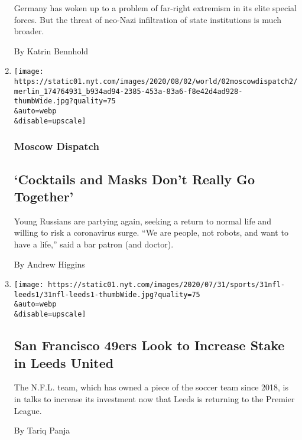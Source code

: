 \begin{enumerate}
  Germany has woken up to a problem of far-right extremism in its elite
  special forces. But the threat of neo-Nazi infiltration of state
  institutions is much broader.

  By Katrin Bennhold
\item
  \href{/2020/08/01/world/europe/russia-moscow-coronavirus.html}{}

  \texttt{[image: https://static01.nyt.com/images/2020/08/02/world/02moscowdispatch2/merlin\_174764931\_b934ad94-2385-453a-83a6-f8e42d4ad928-thumbWide.jpg?quality=75\\\&auto=webp\\\&disable=upscale]}

  \hypertarget{moscow-dispatch}{%
  \subsubsection{Moscow Dispatch}\label{moscow-dispatch}}

  \hypertarget{cocktails-and-masks-dont-really-go-together}{%
  \subsection{`Cocktails and Masks Don't Really Go
  Together'}\label{cocktails-and-masks-dont-really-go-together}}

  Young Russians are partying again, seeking a return to normal life and
  willing to risk a coronavirus surge. ``We are people, not robots, and
  want to have a life,'' said a bar patron (and doctor).

  By Andrew Higgins
\item
  \href{/2020/07/31/sports/soccer/leeds-united-san-francisco-49ers.html}{}

  \texttt{[image: https://static01.nyt.com/images/2020/07/31/sports/31nfl-leeds1/31nfl-leeds1-thumbWide.jpg?quality=75\\\&auto=webp\\\&disable=upscale]}

  \hypertarget{san-francisco-49ers-look-to-increase-stake-in-leeds-united}{%
  \subsection{San Francisco 49ers Look to Increase Stake in Leeds
  United}\label{san-francisco-49ers-look-to-increase-stake-in-leeds-united}}

  The N.F.L. team, which has owned a piece of the soccer team since
  2018, is in talks to increase its investment now that Leeds is
  returning to the Premier League.

  By Tariq Panja
\end{enumerate}

